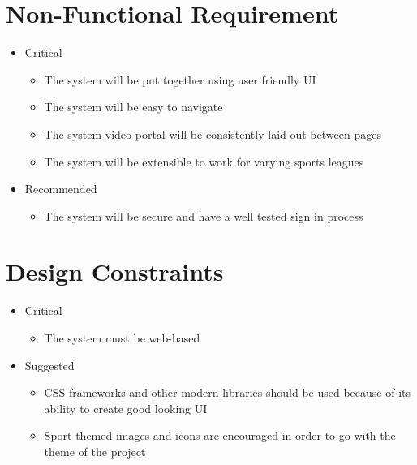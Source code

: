 \section{Non-Functional Requirement}
	\begin{itemize}
    \item Critical 
    	\begin{itemize}
    	\item The system will be put together using user friendly UI 
        \item The system will be  easy to  navigate 
        \item The system video portal will be consistently laid out between pages
        \item The system will be extensible to work for varying sports leagues        
    	\end{itemize}
    \item Recommended
    	\begin{itemize}
        \item The system will be secure and have a well tested sign in process 
    	\end{itemize}
	\end{itemize}
\section{Design Constraints}
	\begin{itemize}
    \item Critical
    	\begin{itemize}
    	\item The system must be web-based 
    	\end{itemize}
	\item Suggested
    	\begin{itemize}
        \item CSS frameworks and other modern libraries should be used because of its ability to create good looking UI 
        \item Sport themed images and icons are encouraged in order to go with the theme of the project 
    	\end{itemize}
	\end{itemize}